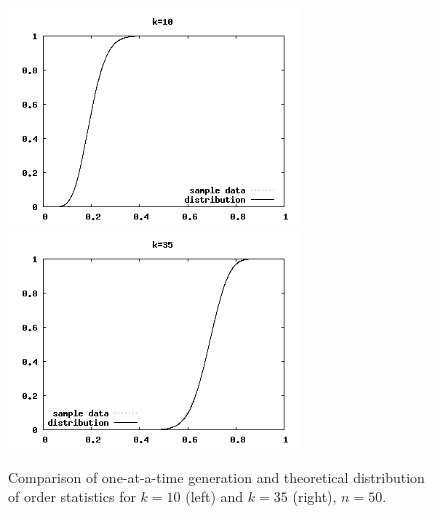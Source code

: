 \documentclass[12pt]{article} %
\begin{document}
\begin{figure}[ht]
\vspace{-3mm}
\centering
\includegraphics[width=7.7cm]{compOneDistrib10}
\includegraphics[width=7.7cm]{compOneDistrib35}
\vspace{-4mm}
\caption{Comparison of one-at-a-time generation and theoretical distribution of order statistics for $k=10$ (left) and $k=35$ (right), $n=50$.}
\label{fig:compOneDistrib}
\vspace{-4mm}
\end{figure}
%
%
%


%
\end{document}
